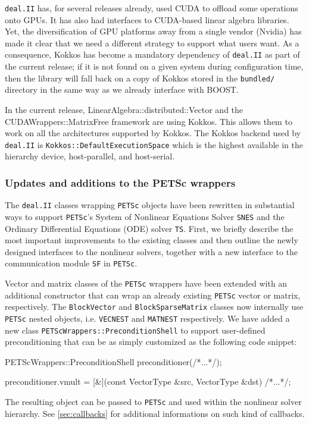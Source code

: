 \documentclass{ansarticle-preprint}
\newcommand{\specialword}[1]{\texttt{#1}}
\newcommand{\dealii}{{\specialword{deal.II}}\xspace}
\newcommand{\petsc}{\specialword{PETSc}\xspace}
\newcommand{\snes}{{\specialword{SNES}}\xspace}
\newcommand{\ts}{{\specialword{TS}}\xspace}
\newcommand{\petscsf}{{\specialword{SF}}\xspace}
\begin{document}
\dealii{} has, for several releases already, used CUDA to offload some
operations onto GPUs. It has also had interfaces to CUDA-based linear
algebra libraries. Yet, the diversification of GPU platforms away from
a single vendor (Nvidia) has made it clear that we need a different
strategy to support what users want. As a consequence, Kokkos has
become a mandatory dependency of \dealii{} as part of the current
release; if it is not found on a given system during configuration
time, then the library will fall back on a copy of Kokkos stored in
the \texttt{bundled/} directory in the same way as we already
interface with BOOST.

In the current release, LinearAlgebra::distributed::Vector and the
CUDAWrappers::MatrixFree framework are using Kokkos. This allows them to work on
all the architectures supported by Kokkos. The Kokkos backend used by \dealii is
\texttt{Kokkos::DefaultExecutionSpace} which is the highest available in the hierarchy
device, host-parallel, and host-serial.



\subsubsection{Updates and additions to the PETSc wrappers}\label{sec:petsc}

The \dealii classes wrapping \petsc objects have been rewritten in
substantial ways
to support \petsc's System of Nonlinear Equations Solver \snes and the Ordinary Differential Equations (ODE)
solver \ts \cite{abhyankar2018petsc}.
First, we briefly describe the most important improvements to the existing
classes and then outline the newly designed interfaces to the nonlinear solvers, together
with a new interface to the communication module \petscsf in \petsc \cite{zhang2021petscsf}.

Vector and matrix classes of the \petsc wrappers have been extended with an additional constructor
that can wrap an already existing \petsc vector or matrix, respectively.
The \texttt{BlockVector} and
\texttt{BlockSparseMatrix} classes now internally use
\petsc nested objects, i.e. \texttt{VECNEST} and  \texttt{MATNEST} respectively.
We have added a new class \texttt{PETScWrappers::PreconditionShell} to support user-defined
preconditioning that can be as simply customized as the following code
snippet:
\begin{c++}
PETScWrappers::PreconditionShell preconditioner(/*...*/);

preconditioner.vmult = [&](const VectorType &src,
                           VectorType       &dst) {/*...*/};

\end{c++}
The resulting object can be passed to \petsc and used within the nonlinear solver hierarchy.
See \ref{sec:callbacks} for additional informations on such kind of callbacks.
\end{document}
